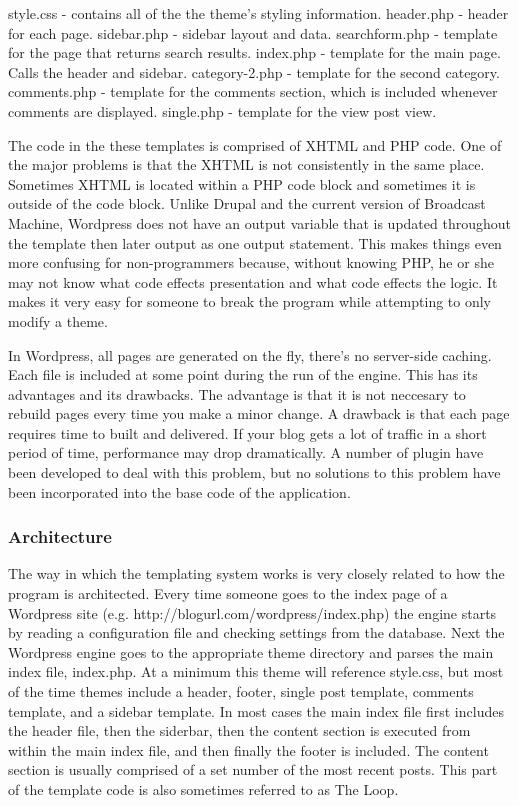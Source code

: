 \documentclass[a4paper,12pt]{report}
\begin{document}
style.css - contains all of the the theme's styling information.
header.php - header for each page.
sidebar.php - sidebar layout and data. 
searchform.php - template for the page that returns search results.
index.php - template for the main page. Calls the header and sidebar.
category-2.php - template for the second category.
comments.php - template for the comments section, which is included whenever comments are displayed.
single.php - template for the view post view.

The code in the these templates is comprised of XHTML and PHP code. 
One of the major problems is that the XHTML is not consistently in the same place. 
Sometimes XHTML is located within a PHP code block and sometimes it is outside of the code block. 
Unlike Drupal and the current version of Broadcast Machine, Wordpress does not have an output variable that is updated throughout the template then later output as one output statement. 
This makes things even more confusing for non-programmers because, without knowing PHP, he or she may not know what code effects presentation and what code effects the logic. 
It makes it very easy for someone to break the program while attempting to only modify a theme. 

In Wordpress, all pages are generated on the fly, there's no server-side caching. 
Each file is included at some point during the run of the engine. 
This has its advantages and its drawbacks. 
The advantage is that it is not neccesary to rebuild pages every time you make a minor change. 
A drawback is that each page requires time to built and delivered. 
If your blog gets a lot of traffic in a short period of time, performance may drop dramatically. A number of plugin have been developed to deal with this problem, but no solutions to this problem have been incorporated into the base code of the application. 



\subsubsection{Architecture}
The way in which the templating system works is very closely related to how the program is architected. 
Every time someone goes to the index page of a Wordpress site (e.g. http://blogurl.com/wordpress/index.php) the engine starts by reading a configuration file and checking settings from the database. 
Next the Wordpress engine goes to the appropriate theme directory and parses the main index file, index.php. 
At a minimum this theme will reference style.css, but most of the time themes include a header, footer, single post template, comments template, and a sidebar template. 
In most cases the main index file first includes the header file, then the siderbar, then the content section is executed from within the main index file, and then finally the footer is included. 
The content section is usually comprised of a set number of the most recent posts. 
This part of the template code is also sometimes referred to as The Loop. 
\end{document}
